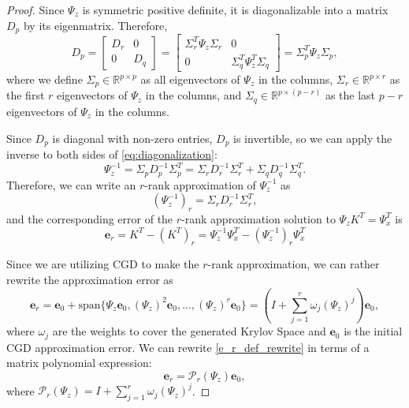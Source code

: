 \documentclass[11p]{elsarticle}
\numberwithin{equation}{section}
\newcommand{\vect}[1]{\ensuremath{\bm{#1}}}
\begin{document}
\begin{proof}
Since $\Psi_{z}$ is symmetric positive definite, it is diagonalizable into a matrix $D_p$ by its eigenmatrix.  Therefore,
\begin{equation}
D_p = \begin{bmatrix}
 D_r & 0\\
 0 & D_q
\end{bmatrix} = \begin{bmatrix}
 \Sigma_r^T \Psi_{z} \Sigma_r & 0\\
 0 & \Sigma_q^T \Psi_{z}^T \Sigma_q
\end{bmatrix} 
= \Sigma_p^T \Psi_{z} \Sigma_p,
\label{eq:diagonalization}
\end{equation}
where we define $\Sigma_p \in \mathbb{R}^{p \times p}$ as all eigenvectors of $\Psi_{z}$ in the columns, $\Sigma_r \in \mathbb{R}^{p \times r}$ as the first $r$ eigenvectors of $\Psi_{z}$ in the columns, and $\Sigma_q \in \mathbb{R}^{p \times (p-r)}$ as the last $p-r$ eigenvectors of $\Psi_{z}$ in the columns.

Since $D_p$ is diagonal with non-zero entries, $D_p$ is invertible, so we can apply the inverse to both sides of \eqref{eq:diagonalization}:
\begin{equation}
    \Psi_{z}^{-1} = \Sigma_p D_p^{-1} \Sigma_p^T = \Sigma_r D_r^{-1} \Sigma_r^T + \Sigma_q D_q^{-1} \Sigma_q^T.
\end{equation}
Therefore, we can write an $r$-rank approximation of $\Psi_{z}^{-1}$ as
\begin{equation}
(\Psi_{z}^{-1})_r = \Sigma_r D_r^{-1} \Sigma_r^T,
\end{equation}
and the corresponding error of the $r$-rank approximation solution to $\Psi_{z}K^T = \Psi_{x}^T$ is
\begin{equation}
    \vect{e}_r = K^T - (K^T)_r = \Psi_{z}^{-1}\Psi_{x}^T - (\Psi_{z}^{-1})_r\Psi_{x}^T
    \label{eq:e_r_def}
\end{equation}


Since we are utilizing CGD to make the $r$-rank approximation, we can rather rewrite the approximation error as 
\begin{equation}
    \vect{e}_r = \vect{e}_0 + \text{span}\{\Psi_{z}\vect{e}_0, (\Psi_{z})^2\vect{e}_0,...,(\Psi_{z})^r\vect{e}_0\}
    = (I + \sum_{j=1}^{r} \omega_j(\Psi_{z})^j)\vect{e}_0,
    \label{e_r_def_rewrite}
\end{equation}
where $\omega_j$ are the weights to cover the generated Krylov Space and $\vect{e}_0$ is the initial CGD approximation error.  
We can rewrite \eqref{e_r_def_rewrite} in terms of a matrix polynomial expression:
\begin{equation}
\vect{e}_r = \mathcal{P}_r(\Psi_{z})\vect{e}_0,
\label{e_r_mat_poly}
\end{equation}
where $\mathcal{P}_r(\Psi_{z}) = I + \sum_{j=1}^{r} \omega_j(\Psi_{z})^j$.



\end{proof}
\end{document}
